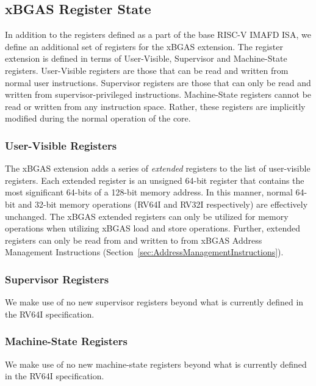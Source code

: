 \documentclass{article}
\begin{document}
\subsection{xBGAS Register State}
In addition to the registers defined as a part of the base RISC-V IMAFD ISA, we define an additional set of registers for the xBGAS extension.  The register extension is defined in terms of User-Visible, Supervisor and Machine-State registers.  User-Visible registers are those that can be read and written from normal user instructions.  Supervisor registers are those that can only be read and written from supervisor-privileged instructions.  Machine-State registers cannot be read or written from any instruction space.  Rather, these registers are implicitly modified during the normal operation of the core.     

\subsubsection{User-Visible Registers} 
The xBGAS extension adds a series of \emph{extended} registers to the list of user-visible registers.  Each extended register is an unsigned 64-bit register that contains the most significant 64-bits of a 128-bit memory address.  In this manner, normal 64-bit and 32-bit memory operations (RV64I and RV32I respectively) are effectively unchanged.  The xBGAS extended registers can only be utilized for memory operations when utilizing xBGAS load and store operations.  Further, extended registers can only be read from and written to from xBGAS Address Management Instructions (Section~\ref{sec:AddressManagementInstructions}).   

\begin{center}
\end{center}

\subsubsection{Supervisor Registers}

We make use of no new supervisor registers beyond what is 
currently defined in the RV64I specification.  

\subsubsection{Machine-State Registers}

We make use of no new machine-state registers beyond what is 
currently defined in the RV64I specification.  
\end{document}
